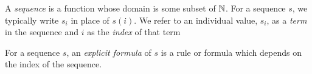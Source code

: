 \guard

% 

\begin{defn}
\label{defn:sequence}
  A \emph{sequence} is a function whose domain is some subset of $\mathbb{N}$.
  For a sequence $s$, we typically write $s_i$ in place of $s(i)$.
  We refer to an individual value, $s_i$, as a \emph{term} in the sequence and $i$ as the \emph{index} of that term
\end{defn}

For a sequence $s$, an \emph{explicit formula} of $s$ is a rule or formula which depends on the index of the sequence.
